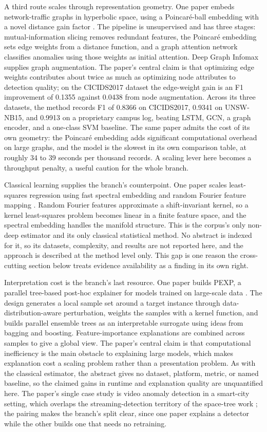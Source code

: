 \documentclass[pdflatex,sn-basic,Numbered]{sn-jnl}%
\begin{document}
A third route scales through representation geometry. One paper embeds network-traffic graphs in hyperbolic space, using a Poincar\'e-ball embedding with a novel distance gain factor \citep{zhang2025graph}. The pipeline is unsupervised and has three stages: mutual-information slicing removes redundant features, the Poincar\'e embedding sets edge weights from a distance function, and a graph attention network classifies anomalies using those weights as initial attention. Deep Graph Infomax supplies graph augmentation. The paper's central claim is that optimizing edge weights contributes about twice as much as optimizing node attributes to detection quality; on the CICIDS2017 dataset the edge-weight gain is an F1 improvement of 0.1355 against 0.0438 from node augmentation. Across its three datasets, the method records F1 of 0.8366 on CICIDS2017, 0.9341 on UNSW-NB15, and 0.9913 on a proprietary campus log, beating LSTM, GCN, a graph encoder, and a one-class SVM baseline. The same paper admits the cost of its own geometry: the Poincar\'e embedding adds significant computational overhead on large graphs, and the model is the slowest in its own comparison table, at roughly 34 to 39 seconds per thousand records. A scaling lever here becomes a throughput penalty, a useful caution for the whole branch.

Classical learning supplies the branch's counterpoint. One paper scales least-squares regression using fast spectral embedding and random Fourier feature mapping \citep{li2026large}. Random Fourier features approximate a shift-invariant kernel, so a kernel least-squares problem becomes linear in a finite feature space, and the spectral embedding handles the manifold structure. This is the corpus's only non-deep estimator and its only classical statistical method. No abstract is indexed for it, so its datasets, complexity, and results are not reported here, and the approach is described at the method level only. This gap is one reason the cross-cutting section below treats evidence availability as a finding in its own right.

Interpretation cost is the branch's last resource. One paper builds PEXP, a parallel tree-based post-hoc explainer for models trained on large-scale data \citep{jiang2026pexp}. The design generates a local sample set around a target instance through data-distribution-aware perturbation, weights the samples with a kernel function, and builds parallel ensemble trees as an interpretable surrogate using ideas from bagging and boosting. Feature-importance explanations are combined across samples to give a global view. The paper's central claim is that computational inefficiency is the main obstacle to explaining large models, which makes explanation cost a scaling problem rather than a presentation problem. As with the classical estimator, the abstract gives no dataset, platform, metric, or named baseline, so the claimed gains in runtime and explanation quality are unquantified here. The paper's single case study is video anomaly detection in a smart-city setting, which overlaps the streaming-detection territory of the space-tree work \citep{gunbilek2026enhanced}; the pairing makes the branch's split clear, since one paper explains a detector while the other builds one that needs no retraining.
\end{document}

